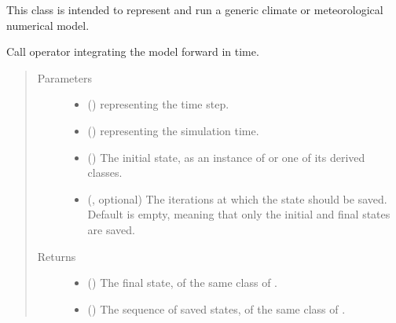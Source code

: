 \documentclass[letterpaper,10pt,english]{sphinxmanual}
\begin{document}
\begin{fulllineitems}
\label{\detokenize{api:model.Model}}
This class is intended to represent and run a generic climate or meteorological numerical model.

\begin{fulllineitems}
\label{\detokenize{api:model.Model.__call__}}
Call operator integrating the model forward in time.
\begin{quote}\begin{description}
\item[{Parameters}] \leavevmode\begin{itemize}
\item {} 
 () \textendash{}  representing the time step.

\item {} 
 () \textendash{}  representing the simulation time.

\item {} 
 () \textendash{} The initial state, as an instance of {\hyperref[\detokenize{api:storages.grid_data.GridData}]{}} or one of its derived classes.

\item {} 
 (, optional) \textendash{} The iterations at which the state should be saved. Default is empty, meaning that only the initial and
final states are saved.

\end{itemize}

\item[{Returns}] \leavevmode
\begin{itemize}
\item {} 
 () \textendash{} The final state, of the same class of .

\item {} 
 () \textendash{} The sequence of saved states, of the same class of .


\end{itemize}
\end{description}
\end{quote}
\end{fulllineitems}
\end{fulllineitems}
\end{document}
